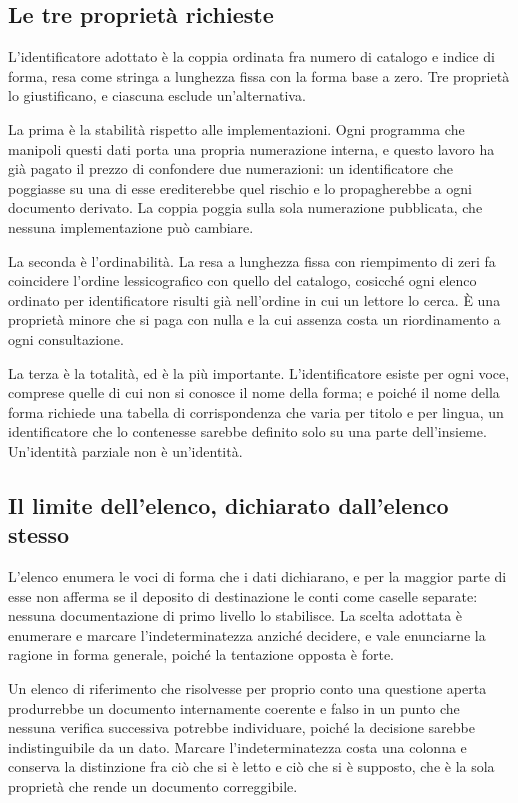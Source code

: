 \subsection*{Le tre proprietà richieste}

L'identificatore adottato è la coppia ordinata fra numero di catalogo e indice di forma, resa come stringa a lunghezza fissa con la forma base a zero. Tre proprietà lo giustificano, e ciascuna esclude un'alternativa.

La prima è la stabilità rispetto alle implementazioni. Ogni programma che manipoli questi dati porta una propria numerazione interna, e questo lavoro ha già pagato il prezzo di confondere due numerazioni: un identificatore che poggiasse su una di esse erediterebbe quel rischio e lo propagherebbe a ogni documento derivato. La coppia poggia sulla sola numerazione pubblicata, che nessuna implementazione può cambiare.

La seconda è l'ordinabilità. La resa a lunghezza fissa con riempimento di zeri fa coincidere l'ordine lessicografico con quello del catalogo, cosicché ogni elenco ordinato per identificatore risulti già nell'ordine in cui un lettore lo cerca. È una proprietà minore che si paga con nulla e la cui assenza costa un riordinamento a ogni consultazione.

La terza è la totalità, ed è la più importante. L'identificatore esiste per ogni voce, comprese quelle di cui non si conosce il nome della forma; e poiché il nome della forma richiede una tabella di corrispondenza che varia per titolo e per lingua, un identificatore che lo contenesse sarebbe definito solo su una parte dell'insieme. Un'identità parziale non è un'identità.

\subsection*{Il limite dell'elenco, dichiarato dall'elenco stesso}

L'elenco enumera le voci di forma che i dati dichiarano, e per la maggior parte di esse non afferma se il deposito di destinazione le conti come caselle separate: nessuna documentazione di primo livello lo stabilisce. La scelta adottata è enumerare e marcare l'indeterminatezza anziché decidere, e vale enunciarne la ragione in forma generale, poiché la tentazione opposta è forte.

Un elenco di riferimento che risolvesse per proprio conto una questione aperta produrrebbe un documento internamente coerente e falso in un punto che nessuna verifica successiva potrebbe individuare, poiché la decisione sarebbe indistinguibile da un dato. Marcare l'indeterminatezza costa una colonna e conserva la distinzione fra ciò che si è letto e ciò che si è supposto, che è la sola proprietà che rende un documento correggibile.

